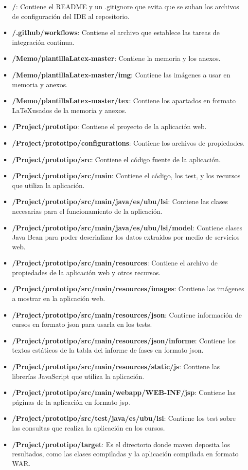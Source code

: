 \begin{itemize}
	\item \textbf{/}: Contiene el README y un .gitignore que evita que se suban los archivos de configuración del IDE al repositorio.
	\item \textbf{/.github/workflows}: Contiene el archivo que establece las tareas de integración continua.
	\item \textbf{/Memo/plantillaLatex-master}: Contiene la memoria y los anexos.
	\item \textbf{/Memo/plantillaLatex-master/img}: Contiene las imágenes a usar en memoria y anexos.
	\item \textbf{/Memo/plantillaLatex-master/tex}: Contiene los apartados en formato \LaTeX usados de la memoria y anexos.
	\item \textbf{/Project/prototipo}: Contiene el proyecto de la aplicación web.
	\item \textbf{/Project/prototipo/configurations}: Contiene los archivos de propiedades.
	\item \textbf{/Project/prototipo/src}: Contiene el código fuente de la aplicación.
	\item \textbf{/Project/prototipo/src/main}: Contiene el código, los test, y los recursos que utiliza la aplicación.
	\item \textbf{/Project/prototipo/src/main/java/es/ubu/lsi}: Contiene las clases necesarias para el funcionamiento de la aplicación.
	\item \textbf{/Project/prototipo/src/main/java/es/ubu/lsi/model}: Contiene clases Java Bean para poder deserializar los datos extraídos por medio de servicios web.
	\item \textbf{/Project/prototipo/src/main/resources}: Contiene el archivo de propiedades de la aplicación web y otros recursos.
	\item \textbf{/Project/prototipo/src/main/resources/images}: Contiene las imágenes a mostrar en la aplicación web.
	\item \textbf{/Project/prototipo/src/main/resources/json}: Contiene información de cursos en formato json para usarla en los tests.
	\item \textbf{/Project/prototipo/src/main/resources/json/informe}: Contiene los textos estáticos de la tabla del informe de fases en formato json.
	\item \textbf{/Project/prototipo/src/main/resources/static/js}: Contiene las librerías JavaScript que utiliza la aplicación.
	\item \textbf{/Project/prototipo/src/main/webapp/WEB-INF/jsp}: Contiene las páginas de la aplicación en formato jsp.
	\item \textbf{/Project/prototipo/src/test/java/es/ubu/lsi}: Contiene los test sobre las consultas que realiza la aplicación en los cursos.
	\item \textbf{/Project/prototipo/target}: Es el directorio donde maven deposita los resultados, como las clases compiladas y la aplicación compilada en formato WAR.
	
\end{itemize}
